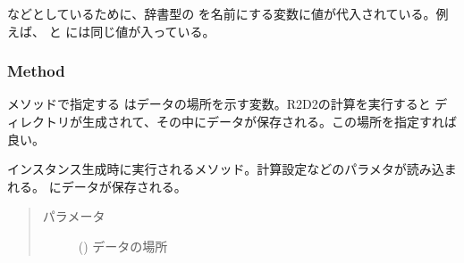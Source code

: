 \documentclass[letterpaper,10pt,dvipdfmx,report]{sphinxmanual}
\begin{document}
などとしているために、辞書型の  を名前にする変数に値が代入されている。例えば、  と  には同じ値が入っている。


\subsubsection{Method}
\label{\detokenize{io:method}}
メソッドで指定する  はデータの場所を示す変数。R2D2の計算を実行すると  ディレクトリが生成されて、その中にデータが保存される。この場所を指定すれば良い。

\begin{fulllineitems}
\label{\detokenize{io:R2D2.R2D2_data.__init__}}
インスタンス生成時に実行されるメソッド。計算設定などのパラメタが読み込まれる。 {\hyperref[\detokenize{io:R2D2.R2D2_data.p}]{}} にデータが保存される。
\begin{quote}\begin{description}
\item[{パラメータ}] \leavevmode
{} () \sphinxhyphen{}\sphinxhyphen{} データの場所

\end{description}\end{quote}

\end{fulllineitems}

\end{document}
